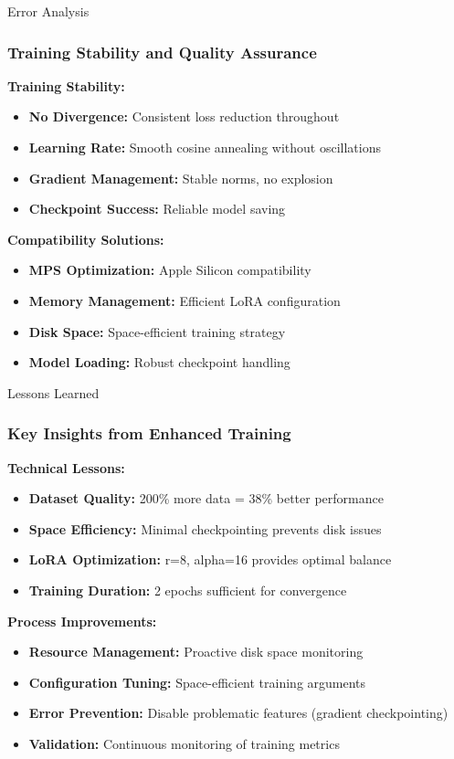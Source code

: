 \documentclass[aspectratio=169]{beamer}
\begin{document}
\begin{frame}{Error Analysis}
\frametitle{Training Stability and Quality Assurance}

\textbf{Training Stability:}
\begin{itemize}
    \item \textbf{No Divergence:} Consistent loss reduction throughout
    \item \textbf{Learning Rate:} Smooth cosine annealing without oscillations
    \item \textbf{Gradient Management:} Stable norms, no explosion
    \item \textbf{Checkpoint Success:} Reliable model saving
\end{itemize}

\textbf{Compatibility Solutions:}
\begin{itemize}
    \item \textbf{MPS Optimization:} Apple Silicon compatibility
    \item \textbf{Memory Management:} Efficient LoRA configuration
    \item \textbf{Disk Space:} Space-efficient training strategy
    \item \textbf{Model Loading:} Robust checkpoint handling
\end{itemize}
\end{frame}

\begin{frame}{Lessons Learned}
\frametitle{Key Insights from Enhanced Training}

\textbf{Technical Lessons:}
\begin{itemize}
    \item \textbf{Dataset Quality:} 200\% more data = 38\% better performance
    \item \textbf{Space Efficiency:} Minimal checkpointing prevents disk issues
    \item \textbf{LoRA Optimization:} r=8, alpha=16 provides optimal balance
    \item \textbf{Training Duration:} 2 epochs sufficient for convergence
\end{itemize}

\textbf{Process Improvements:}
\begin{itemize}
    \item \textbf{Resource Management:} Proactive disk space monitoring
    \item \textbf{Configuration Tuning:} Space-efficient training arguments
    \item \textbf{Error Prevention:} Disable problematic features (gradient checkpointing)
    \item \textbf{Validation:} Continuous monitoring of training metrics
\end{itemize}
\end{frame}
\end{document}
